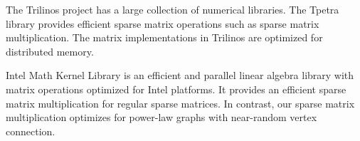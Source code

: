 The Trilinos project \cite{trilinos} has a large collection of numerical libraries.
The Tpetra library provides efficient sparse matrix operations such as sparse matrix
multiplication. The matrix implementations in Trilinos are optimized for
distributed memory.

Intel Math Kernel Library \cite{mkl} is an efficient and parallel linear
algebra library with matrix operations optimized for Intel
platforms. It provides an efficient sparse matrix multiplication
for regular sparse matrices. In contrast, our sparse matrix multiplication
optimizes for power-law graphs with near-random vertex connection.
